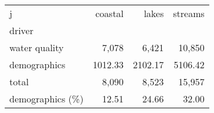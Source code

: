 \begin{tabular}{lrrr}
\toprule
j & coastal & lakes & streams \\
driver &  &  &  \\
\midrule
water quality & 7,078 & 6,421 & 10,850 \\
demographics & 1012.33 & 2102.17 & 5106.42 \\
total & 8,090 & 8,523 & 15,957 \\
demographics (\%) & 12.51 & 24.66 & 32.00 \\
\bottomrule
\end{tabular}
